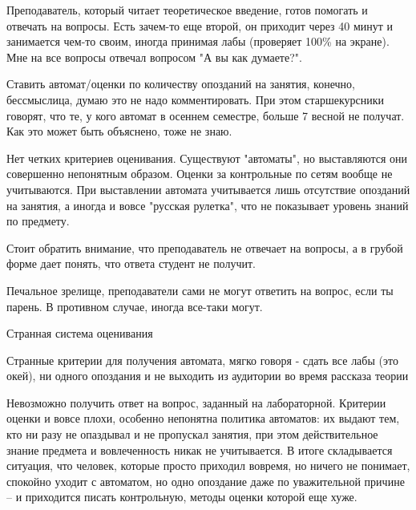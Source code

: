             \begin{commentbox} 
                Преподаватель, который читает теоретическое введение, готов помогать и отвечать на вопросы. Есть зачем-то еще второй, он приходит через 40 минут и занимается чем-то своим, иногда принимая лабы (проверяет 100\% на экране). Мне на все вопросы отвечал вопросом "А вы как думаете?".

                Ставить автомат/оценки по количеству опозданий на занятия, конечно, бессмыслица, думаю это не надо комментировать. При этом старшекурсники говорят, что те, у кого автомат в осеннем семестре, больше 7 весной не получат. Как это может быть объяснено, тоже не знаю. 
            \end{commentbox} 
       
            \begin{commentbox} 
                Нет четких критериев оценивания. Существуют "автоматы", но выставляются они совершенно непонятным образом. Оценки за контрольные по сетям вообще не учитываются. При выставлении автомата учитывается лишь отсутствие опозданий на занятия, а иногда и вовсе "русская рулетка", что не показывает уровень знаний по предмету.
        
                Стоит обратить внимание, что преподаватель не отвечает на вопросы, а в грубой форме дает понять, что ответа студент не получит. 
            \end{commentbox} 
       
            \begin{commentbox} 
                Печальное зрелище, преподаватели сами не могут ответить на вопрос, если ты парень. В противном случае, иногда все-таки могут.  
            \end{commentbox} 
        
            \begin{commentbox} 
                Странная система оценивания 
            \end{commentbox} 
        
            \begin{commentbox} 
                Странные критерии для получения автомата, мягко говоря - сдать все лабы (это окей), ни одного опоздания и не выходить из аудитории во время рассказа теории 
            \end{commentbox} 
        
            \begin{commentbox} 
                Невозможно получить ответ на вопрос, заданный на лабораторной. Критерии оценки и вовсе плохи, особенно непонятна политика автоматов: их выдают тем, кто ни разу не опаздывал и не пропускал занятия, при этом действительное знание предмета и вовлеченность никак не учитывается. В итоге складывается ситуация, что человек, которые просто приходил вовремя, но ничего не понимает, спокойно уходит с автоматом, но одно опоздание даже по уважительной причине – и приходится писать контрольную, методы оценки которой еще хуже. 
            \end{commentbox} 
        
